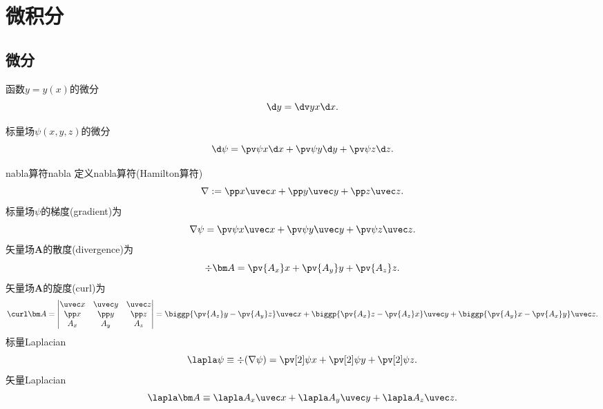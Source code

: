 \section{微积分}
\label{sec:calculus}

\subsection{微分}
\label{ssec:differential calculus}

\begin{compactitem}
	\item 函数$y=y(x)$的微分
    \[
        \d y=\dv yx\d x.
    \]
	\item 标量场$\psi(x,y,z)$的微分
    \begin{equation}
        \d\psi=\pv\psi x\d x+\pv\psi y\d y+\pv\psi z\d z.
    \end{equation}
\end{compactitem}

\begin{definition}
    {nabla算符}{nabla}
    定义nabla算符(Hamilton算符)
    \begin{equation}
        \nabla:=\pp x\uvec x+\pp y\uvec y+\pp z\uvec z.
    \end{equation}
    标量场$\psi$的梯度(gradient)为
    \begin{equation}
        \nabla\psi=\pv\psi x\uvec x+\pv\psi y\uvec y+\pv\psi z\uvec z.
    \end{equation}
    矢量场$\bm A$的散度(divergence)为
    \begin{equation}
        \div\bm A=\pv{A_x}x+\pv{A_y}y+\pv{A_z}z.
    \end{equation}
    矢量场$\bm A$的旋度(curl)为
    \begin{equation}
        \curl\bm A=\begin{vmatrix}
            \uvec x&\uvec y&\uvec z\\
            \pp x&\pp y&\pp z\\
            A_x&A_y&A_z
        \end{vmatrix}
        =\biggp{\pv{A_z}y-\pv{A_y}z}\uvec x+\biggp{\pv{A_x}z-\pv{A_z}x}\uvec y+\biggp{\pv{A_y}x-\pv{A_x}y}\uvec z.
    \end{equation}
    标量Laplacian
    \begin{equation}
        \lapla\psi \equiv \div(\nabla\psi) = \pv[2]\psi x + \pv[2]\psi y + \pv[2]\psi z.
    \end{equation}
    矢量Laplacian
    \begin{equation}
        \lapla\bm A\equiv\lapla A_x\uvec x+\lapla A_y\uvec y+\lapla A_z\uvec z.
    \end{equation}
\end{definition}

